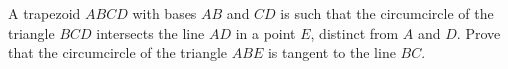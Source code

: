 \problem
A trapezoid $ABCD$ with bases $AB$ and $CD$ is such that the circumcircle
of the triangle $BCD$ intersects the line $AD$ in a point $E$, distinct from
$A$ and $D$.
Prove that the circumcircle of the triangle $ABE$ is tangent to the line $BC$.
\solution
\endproblem
